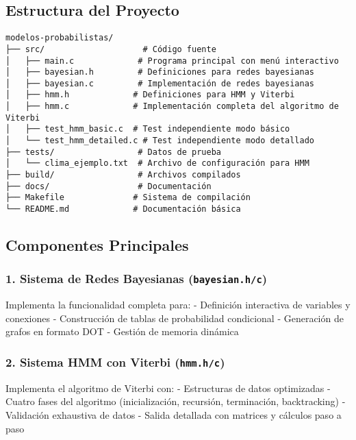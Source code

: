 \documentclass[
]{article}
\begin{document}
\subsection{Estructura del Proyecto}\label{estructura-del-proyecto}

\begin{verbatim}
modelos-probabilistas/
├── src/                    # Código fuente
│   ├── main.c             # Programa principal con menú interactivo
│   ├── bayesian.h         # Definiciones para redes bayesianas
│   ├── bayesian.c         # Implementación de redes bayesianas
│   ├── hmm.h             # Definiciones para HMM y Viterbi
│   ├── hmm.c             # Implementación completa del algoritmo de Viterbi
│   ├── test_hmm_basic.c  # Test independiente modo básico
│   └── test_hmm_detailed.c # Test independiente modo detallado
├── tests/                 # Datos de prueba
│   └── clima_ejemplo.txt  # Archivo de configuración para HMM
├── build/                 # Archivos compilados
├── docs/                  # Documentación
├── Makefile              # Sistema de compilación
└── README.md             # Documentación básica
\end{verbatim}

\subsection{Componentes Principales}\label{componentes-principales}

\subsubsection{\texorpdfstring{1. Sistema de Redes Bayesianas
(\texttt{bayesian.h/c})}{1. Sistema de Redes Bayesianas (bayesian.h/c)}}\label{sistema-de-redes-bayesianas-bayesian.hc}

Implementa la funcionalidad completa para: - Definición interactiva de
variables y conexiones - Construcción de tablas de probabilidad
condicional - Generación de grafos en formato DOT - Gestión de memoria
dinámica

\subsubsection{\texorpdfstring{2. Sistema HMM con Viterbi
(\texttt{hmm.h/c})}{2. Sistema HMM con Viterbi (hmm.h/c)}}\label{sistema-hmm-con-viterbi-hmm.hc}

Implementa el algoritmo de Viterbi con: - Estructuras de datos
optimizadas - Cuatro fases del algoritmo (inicialización, recursión,
terminación, backtracking) - Validación exhaustiva de datos - Salida
detallada con matrices y cálculos paso a paso
\end{document}
